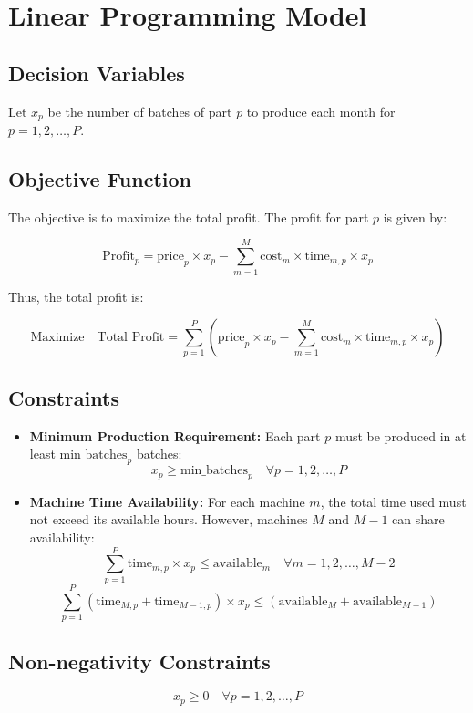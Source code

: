 \documentclass{article}
\begin{document}
\section*{Linear Programming Model}

\subsection*{Decision Variables}
Let \( x_p \) be the number of batches of part \( p \) to produce each month for \( p = 1, 2, \ldots, P \).

\subsection*{Objective Function}
The objective is to maximize the total profit. The profit for part \( p \) is given by:

\[
\text{Profit}_p = \text{price}_p \times x_p - \sum_{m=1}^{M} \text{cost}_m \times \text{time}_{m,p} \times x_p
\]

Thus, the total profit is:

\[
\text{Maximize} \quad \text{Total Profit} = \sum_{p=1}^{P} \left( \text{price}_p \times x_p - \sum_{m=1}^{M} \text{cost}_m \times \text{time}_{m,p} \times x_p \right)
\]

\subsection*{Constraints}

\begin{itemize}
    \item \textbf{Minimum Production Requirement:} Each part \( p \) must be produced in at least \( \text{min\_batches}_p \) batches:
    \[
    x_p \geq \text{min\_batches}_p \quad \forall p = 1, 2, \ldots, P
    \]

    \item \textbf{Machine Time Availability:} For each machine \( m \), the total time used must not exceed its available hours. However, machines \( M \) and \( M-1 \) can share availability:
    \[
    \sum_{p=1}^{P} \text{time}_{m,p} \times x_p \leq \text{available}_m \quad \forall m = 1, 2, \ldots, M-2
    \]
    \[
    \sum_{p=1}^{P} (\text{time}_{M,p} + \text{time}_{M-1,p}) \times x_p \leq (\text{available}_M + \text{available}_{M-1})
    \]
\end{itemize}

\subsection*{Non-negativity Constraints}
\[
x_p \geq 0 \quad \forall p = 1, 2, \ldots, P
\]
\end{document}
